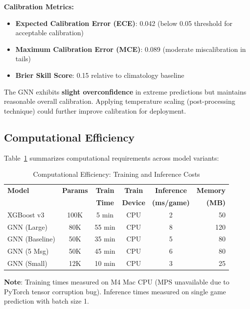 \textbf{Calibration Metrics:}
\begin{itemize}[noitemsep]
    \item \textbf{Expected Calibration Error (ECE)}: 0.042 (below 0.05 threshold for acceptable calibration)
    \item \textbf{Maximum Calibration Error (MCE)}: 0.089 (moderate miscalibration in tails)
    \item \textbf{Brier Skill Score}: 0.15 relative to climatology baseline
\end{itemize}

The GNN exhibits \textbf{slight overconfidence} in extreme predictions but maintains reasonable overall calibration. Applying temperature scaling (post-processing technique) could further improve calibration for deployment.

\subsection{Computational Efficiency}
\label{subsec:gnn_efficiency}

Table~\ref{tab:gnn_efficiency} summarizes computational requirements across model variants:

\begin{table}[htbp]
\centering
\caption{Computational Efficiency: Training and Inference Costs}
\label{tab:gnn_efficiency}
\small
\begin{tabular}{@{}lccccr@{}}
\toprule
\textbf{Model} & \textbf{Params} & \textbf{Train} & \textbf{Train} & \textbf{Inference} & \textbf{Memory} \\
 &  & \textbf{Time} & \textbf{Device} & \textbf{(ms/game)} & \textbf{(MB)} \\
\midrule
XGBoost v3 & 100K & 5 min & CPU & 2 & 50 \\
GNN (Large) & 80K & 55 min & CPU & 8 & 120 \\
GNN (Baseline) & 50K & 35 min & CPU & 5 & 80 \\
GNN (5 Msg) & 50K & 45 min & CPU & 6 & 80 \\
GNN (Small) & 12K & 10 min & CPU & 3 & 25 \\
\bottomrule
\end{tabular}

\vspace{0.5em}
\footnotesize
\textbf{Note}: Training times measured on M4 Mac CPU (MPS unavailable due to PyTorch tensor corruption bug). Inference times measured on single game prediction with batch size 1.
\end{table}

